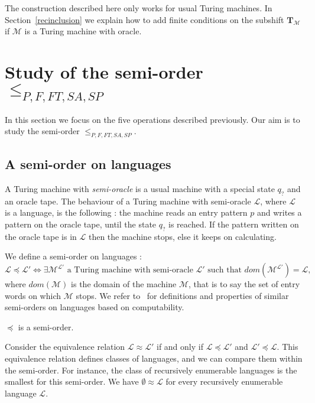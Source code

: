 \documentclass[proceedings]{stacs}
\theoremstyle{plain}\newtheorem{satz}[thm]{Satz}
\theoremstyle{definition}\newtheorem{crucial}[thm]{Crucial Definition}
\newcommand{\T}{\mathbf{T}}
\newcommand{\TM}{\mathcal{M}}
\newcommand{\Lang}{\mathcal{L}}
\begin{document}
\begin{remark}
The construction described here only works for usual Turing machines. In Section~\ref{recinclusion} we explain how to add finite conditions on the subshift $\T_{\TM}$ if $\TM$ is a Turing machine with oracle. 
\end{remark}

\section{Study of the semi-order $\leq_{P,F,FT,SA,SP}$}\label{MainResult}

In this section we focus on the five operations described previously. Our aim is to study the semi-order $\leq_{P,F,FT,SA,SP}$.

	\subsection{A semi-order on languages}

A Turing machine with \emph{semi-oracle} is a usual machine with a special state $q_?$ and an oracle tape. The behaviour of a Turing machine with semi-oracle $\Lang$, where $\Lang$ is a language, is the following : the machine reads an entry pattern $p$ and writes a pattern on the oracle tape, until the state $q_?$ is reached. If the pattern written on the oracle tape is in $\Lang$ then the machine stops, else it keeps on calculating.

We define a semi-order on languages :
$$\Lang\preceq \Lang'\Longleftrightarrow \exists \TM^{\Lang'}\text{ a Turing machine with semi-oracle }\Lang'\text{ such that }dom(\TM^{\Lang'})=\Lang,$$
where $dom(\TM)$ is the domain of the machine $\TM$, that is to say the set of entry words on which $\TM$ stops. We refer to~\cite{rogersjr1987trf} for definitions and properties of similar semi-orders on languages based on computability.

\begin{prop}\label{semi-order}
$\preceq$ is a semi-order.
\end{prop}

Consider the equivalence relation $\Lang\approx \Lang'$ if and only if $\Lang\preceq \Lang'$ and $\Lang'\preceq \Lang$. This equivalence relation defines classes of languages, and we can compare them within the semi-order. For instance, the class of recursively enumerable languages is the smallest for this semi-order. We have $\emptyset\approx \Lang$ for every recursively enumerable language $\Lang$.
\end{document}
